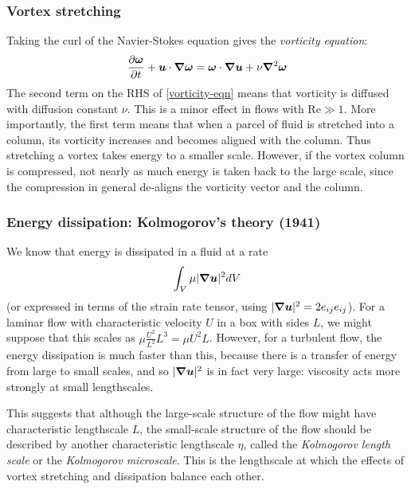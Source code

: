\subsubsection{Vortex stretching}

Taking the curl of the Navier-Stokes equation gives the \textit{vorticity
equation}:
\begin{equation}
    \frac{\partial\boldsymbol{\omega}}{\partial t} + \boldsymbol{u}\cdot\boldsymbol{\nabla}\boldsymbol{\omega} 
     = \boldsymbol{\omega}\cdot\boldsymbol{\nabla}\boldsymbol{u} + \nu\boldsymbol{\nabla}^2\boldsymbol{\omega}
 \label{vorticity-eqn}
\end{equation}
The second term on the RHS of \ref{vorticity-eqn} means that vorticity is
diffused with diffusion constant $\nu$. This is a minor effect in flows with
$\mathrm{Re}\gg1$. More importantly, the first term means that when a parcel of
fluid is stretched into a column, its vorticity increases and becomes aligned
with the column. Thus stretching a vortex takes energy to a smaller scale. 
However, if the vortex column is compressed, not nearly as much energy is taken
back to the large scale, since the compression in general de-aligns the
vorticity vector and the column.

\subsubsection{Energy dissipation: Kolmogorov's theory (1941)}

We know that energy is dissipated in a fluid at a rate
\begin{equation}
    \int_V\mu|\boldsymbol{\nabla}\boldsymbol{u}|^2dV
\end{equation}
(or expressed in terms of the strain rate tensor, using
$|\boldsymbol{\nabla}\boldsymbol{u}|^2=2e_{ij}e_{ij}$). For a laminar flow with characteristic
velocity $U$ in a box with sides $L$, we might suppose that this scales as
$\mu\frac{U^2}{L^2}L^3 = \mu U^2 L$.  However, for a turbulent flow, the energy
dissipation is much faster than this, because there is a transfer of energy from
large to small scales, and so $|\boldsymbol{\nabla}\boldsymbol{u}|^2$ is in fact very large: viscosity
acts more strongly at small lengthscales.

This suggests that although the large-scale structure of the flow might have
characteristic lengthscale $L$, the small-scale structure of the flow should be
described by another characteristic lengthscale $\eta$, called the
\textit{Kolmogorov length scale} or the \textit{Kolmogorov microscale}. This is
the lengthscale at which the effects of vortex stretching and dissipation
balance each other.

